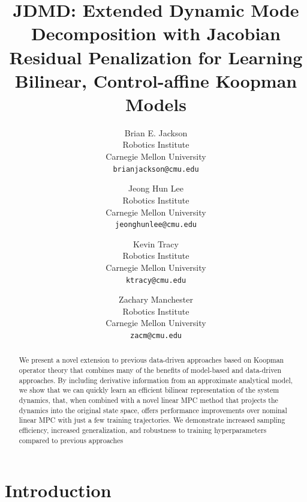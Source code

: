 \documentclass{article}
\title{
  JDMD: Extended Dynamic Mode Decomposition with Jacobian Residual Penalization
  for Learning Bilinear, Control-affine Koopman Models
}
\author{
Brian E. Jackson \\
Robotics Institute \\
Carnegie Mellon University \\
\texttt{brianjackson@cmu.edu} \\
\and
Jeong Hun Lee \\
Robotics Institute \\
Carnegie Mellon University \\
\texttt{jeonghunlee@cmu.edu} \\
\and
Kevin Tracy \\
Robotics Institute \\
Carnegie Mellon University \\
\texttt{ktracy@cmu.edu} \\
\and
Zachary Manchester \\
Robotics Institute \\
Carnegie Mellon University \\
\texttt{zacm@cmu.edu} \\
}
\begin{document}
\maketitle

\begin{abstract}
  We present a novel extension to previous data-driven approaches based on Koopman
  operator theory that combines many of the benefits of model-based and data-driven
  approaches.  By including derivative information from an approximate analytical model, we
  show that we can quickly learn an efficient bilinear representation of the system
  dynamics, that, when combined with a novel linear MPC method that projects the dynamics
  into the original state space, offers performance improvements over nominal linear MPC
  with just a few training trajectories. We demonstrate increased sampling efficiency,
  increased generalization, and robustness to training hyperparameters compared to previous
  approaches
\end{abstract}

\section{Introduction}
\end{document}
